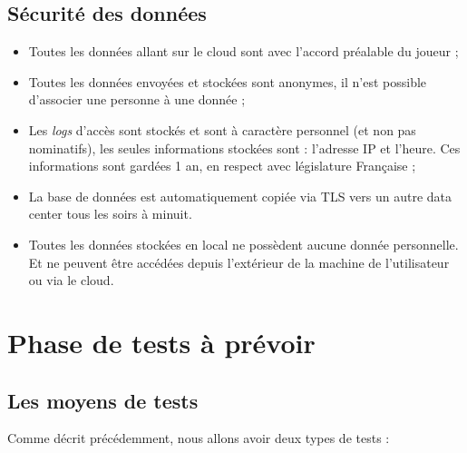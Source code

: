 \documentclass[final]{article}
\begin{document}
      \subsection{Sécurité des données}
        \begin{itemize}
          \item Toutes les données allant sur le cloud sont avec l'accord préalable du joueur ;
          \item Toutes les données envoyées et stockées sont anonymes, 
                il n'est possible d'associer une personne à une donnée ;
          \item Les \emph{logs} d'accès sont stockés et sont à caractère personnel (et non pas nominatifs),
                les seules informations stockées sont : l'adresse IP et l'heure. 
                Ces informations sont gardées 1 an, en respect avec législature Française ;
          \item La base de données est automatiquement copiée via TLS
                vers un autre data center tous les soirs à minuit.
          \item Toutes les données stockées en local ne possèdent aucune donnée personnelle.
                Et ne peuvent être accédées depuis l'extérieur de la machine de l'utilisateur 
                ou via le cloud.
        \end{itemize}
        

  \section{Phase de tests à prévoir}
    \subsection{Les moyens de tests}
      Comme décrit précédemment, nous allons avoir deux types de tests :
		
\end{document}
